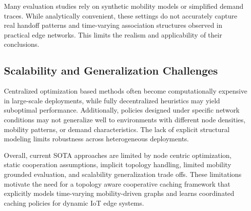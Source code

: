 Many evaluation studies rely on synthetic mobility models or simplified demand traces. While analytically convenient, these settings do not accurately capture real handoff patterns and time-varying association structures observed in practical edge networks. This limits the realism and applicability of their conclusions.

\subsection{Scalability and Generalization Challenges}

Centralized optimization based methods often become computationally expensive in large-scale deployments, while fully decentralized heuristics may yield suboptimal performance. Additionally, policies designed under specific network conditions may not generalize well to environments with different node densities, mobility patterns, or demand characteristics. The lack of explicit structural modeling limits robustness across heterogeneous deployments.

Overall, current SOTA approaches are limited by node centric optimization, static cooperation assumptions, implicit topology handling, limited mobility grounded evaluation, and scalability generalization trade offs. These limitations motivate the need for a topology aware cooperative caching framework that explicitly models time-varying mobility-driven graphs and learns coordinated caching policies for dynamic IoT edge systems.
